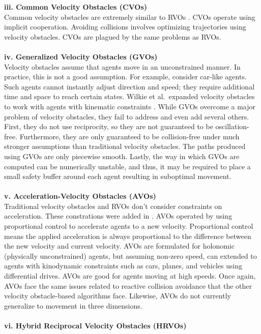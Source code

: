 \documentclass[tog]{acmsiggraph}
\begin{document}
\textbf{iii. Common Velocity Obstacles (CVOs)}
\\
Common velocity obstacles are extremely similar to RVOs \cite{abe2001collision}. CVOs operate using implicit cooperation. Avoiding collisions involves optimizing trajectories using velocity obstacles. CVOs are plagued by the same problems as RVOs.
\\ \\
\textbf{iv. Generalized Velocity Obstacles (GVOs)}
\\
Velocity obstacles assume that agents move in an unconstrained manner. In practice, this is not a good assumption. For example, consider car-like agents. Such agents cannot instantly adjust direction and speed; they require additional time and space to reach certain states. Wilkie et al.\ expanded velocity obstacles to work with agents with kinematic constraints \cite{wilkie2009generalized}. While GVOs overcome a major problem of velocity obstacles, they fail to address and even add several others. First, they do not use reciprocity, so they are not guaranteed to be oscillation-free. Furthermore, they are only guaranteed to be collision-free under much stronger assumptions than traditional velocity obstacles. The paths produced using GVOs are only piecewise smooth. Lastly, the way in which GVOs are computed can be numerically unstable, and thus, it may be required to place a small safety buffer around each agent resulting in suboptimal movement.
\\ \\
\textbf{v. Acceleration-Velocity Obstacles (AVOs)}
\\
Traditional velocity obstacles and RVOs don't consider constraints on acceleration. These constrations were added in \cite{van2011reciprocal1}. AVOs operated by using proportional control to accelerate agents to a new velocity. Proportional control means the applied acceleration is always proportional to the difference between the new velocity and current velocity. AVOs are formulated for holonomic (physically unconstrained) agents, but assuming non-zero speed, can extended to agents with kinodynamic constraints such as cars, planes, and vehicles using differential drives. AVOs are good for agents moving at high speeds. Once again, AVOs face the same issues related to reactive collision avoidance that the other velocity obstacle-based algorithms face. Likewise, AVOs do not currently generalize to movement in three dimensions.
\\ \\
\textbf{vi. Hybrid Reciprocal Velocity Obstacles (HRVOs)}
\end{document}
